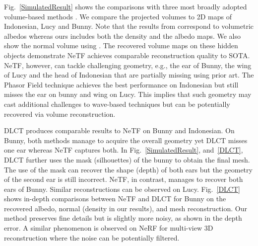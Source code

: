 \documentclass[10pt,journal,compsoc]{IEEEtran}
\begin{document}
Fig.~\ref{SimulatedResult} shows the comparisons with three most broadly adopted volume-based methods \cite{2019FK, 2019Liu, 2020DLCT}. We compare the projected volumes to 2D maps of Indonesian, Lucy and Bunny. Note that the results from \cite{2019FK, 2019Liu} correspond to volumetric albedos whereas ours includes both the density and the albedo maps. We also show the normal volume using \cite{2020DLCT}.  The recovered volume maps on these hidden objects demonstrate NeTF achieves comparable reconstruction quality to SOTA. NeTF, however, can tackle challenging geometry, e.g., the ear of Bunny, the wing of Lucy and the head of Indonesian that are partially missing using prior art. The Phasor Field technique achieves the best performance on Indonesian but still misses the ear on bunny and wing on Lucy. This implies that such geometry may cast additional challenges to wave-based techniques but can be potentially recovered via volume reconstruction. 
 
DLCT \cite{2020DLCT} produces comparable results to NeTF on Bunny and Indonesian. On Bunny, both methods manage to acquire the overall geometry yet DLCT misses one ear whereas NeTF captures both. In Fig.~\ref{SimulatedResult}, and~\ref{DLCT}, DLCT further uses the mask (silhouettes) of the bunny to obtain the final mesh. The use of the mask can recover the shape (depth) of both ears but the geometry of the second ear is still incorrect. NeTF, in contrast, manages to recover both ears of Bunny. Similar reconstructions can be observed on Lucy. Fig.~\ref{DLCT} shows in-depth comparisons between NeTF and DLCT for Bunny on the recovered albedo, normal (density in our results), and mesh reconstruction. Our method preserves fine details but is slightly more noisy, as shown in the depth error. A similar phenomenon is observed on NeRF for multi-view 3D reconstruction where the noise can be potentially filtered.  
 
\end{document}
